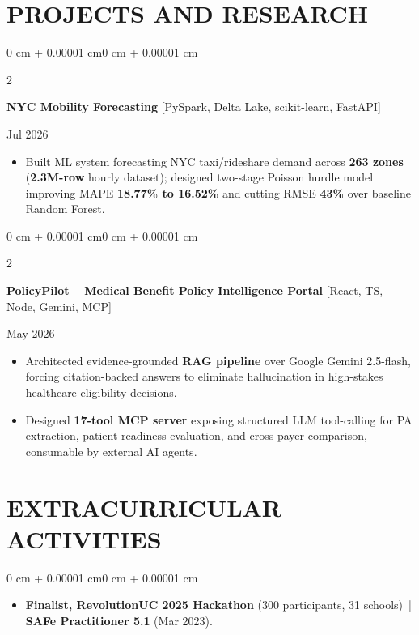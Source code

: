 \documentclass[10pt, letterpaper]{article}
\newenvironment{highlights}{
    \begin{itemize}[
        topsep=0.10 cm,
        parsep=0.06 cm,
        partopsep=0pt,
        itemsep=0.06 cm,
        leftmargin=12pt
    ]
}{
    \end{itemize}
}
\newenvironment{onecolentry}{
    \begin{adjustwidth}{0 cm + 0.00001 cm}{0 cm + 0.00001 cm}
}{
    \end{adjustwidth}
}
\newenvironment{twocolentry}[2][]{
    \onecolentry
    \def\secondColumn{#2}
    \setcolumnwidth{\fill, 4.5 cm}
    \begin{paracol}{2}
}{
    \switchcolumn \raggedleft \secondColumn
    \end{paracol}
    \endonecolentry
}
\begin{document}
\section{PROJECTS AND RESEARCH}
\begin{twocolentry}{Jul 2026}
\textbf{NYC Mobility Forecasting} [PySpark, Delta Lake, scikit-learn, FastAPI]
\end{twocolentry}
\begin{highlights}
  \item Built ML system forecasting NYC taxi/rideshare demand across \textbf{263 zones} (\textbf{2.3M-row} hourly dataset); designed two-stage Poisson hurdle model improving MAPE \textbf{18.77\% to 16.52\%} and cutting RMSE \textbf{43\%} over baseline Random Forest.
\end{highlights}

\vspace{0.12 cm}

\begin{twocolentry}{May 2026}
\textbf{PolicyPilot -- Medical Benefit Policy Intelligence Portal} [React, TS, Node, Gemini, MCP]
\end{twocolentry}
\begin{highlights}
  \item Architected evidence-grounded \textbf{RAG pipeline} over Google Gemini 2.5-flash, forcing citation-backed answers to eliminate hallucination in high-stakes healthcare eligibility decisions.
  \item Designed \textbf{17-tool MCP server} exposing structured LLM tool-calling for PA extraction, patient-readiness evaluation, and cross-payer comparison, consumable by external AI agents.
\end{highlights}

\section{EXTRACURRICULAR ACTIVITIES}
\begin{onecolentry}
\begin{highlights}
  \item \textbf{Finalist, RevolutionUC 2025 Hackathon} (300 participants, 31 schools) \,|\, \textbf{SAFe Practitioner 5.1} (Mar 2023).
\end{highlights}
\end{onecolentry}
\end{document}
